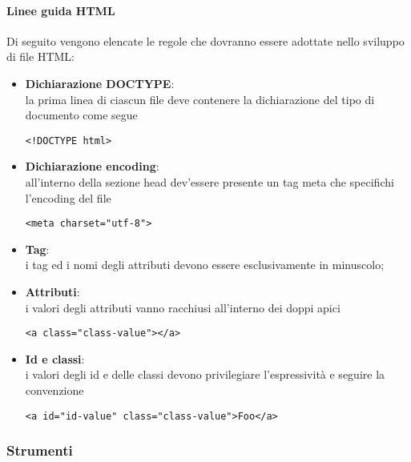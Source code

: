 \paragraph{Linee guida HTML}
\label{par:convenzioni_html}

Di seguito vengono elencate le regole che dovranno essere adottate nello sviluppo di file HTML:
\begin{itemize}
	\item \textbf{Dichiarazione DOCTYPE}:\\
		la prima linea di ciascun file deve contenere la dichiarazione del tipo di documento come segue\\
		\begin{lstlisting}[style=html]
			<!DOCTYPE html>
		\end{lstlisting}
	\item \textbf{Dichiarazione encoding}:\\
		all'interno della sezione head dev'essere presente un tag meta che specifichi l'encoding del file
		\begin{lstlisting}[style=html]
			<meta charset="utf-8">
		\end{lstlisting}
	\item \textbf{Tag}:\\
		i tag ed i nomi degli attributi devono essere esclusivamente in minuscolo;
	\item \textbf{Attributi}:\\
		i valori degli attributi vanno racchiusi all'interno dei doppi apici
		\begin{lstlisting}[style=html]
			<a class="class-value"></a>
		\end{lstlisting}
	\item \textbf{Id e classi}:\\
		i valori degli id e delle classi devono privilegiare l'espressività e seguire la convenzione 
		\begin{lstlisting}[style=html]
			<a id="id-value" class="class-value">Foo</a>
		\end{lstlisting}
\end{itemize}

\subsubsection{Strumenti}

